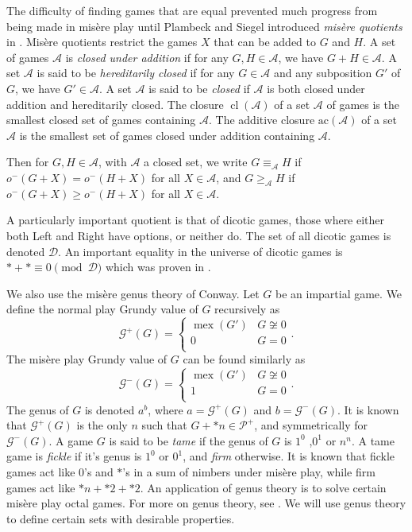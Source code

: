 \documentclass{amsart}
\theoremstyle{plain}
\theoremstyle{definition}
\theoremstyle{remark}
\numberwithin{equation}{section}
\numberwithin{thm}{section}
\DeclareMathOperator{\cl}{cl}
\DeclareMathOperator{\mex}{mex}
\begin{document}
The difficulty of finding games that are equal prevented much progress from being made in mis\`ere play until Plambeck and Siegel introduced \emph{mis\`ere quotients} in \cite{plambeck2008misere}. Mis\`ere quotients restrict the games $X$ that can be added to $G$ and $H$.
A set of games $\mathscr{A}$ is \emph{closed under addition} if for any $G,H \in \mathscr{A}$, we have $G +H \in \mathscr{A}$. A set $\mathscr{A}$ is said to be \emph{hereditarily closed} if for any $G \in \mathscr{A}$ and any subposition $G'$ of $G$, we have $G' \in \mathscr{A}$. A set $\mathscr{A}$ is said to be \emph{closed} if $\mathscr{A}$ is both closed under addition and hereditarily closed. The closure $\cl (\mathscr{A})$ of a set $\mathscr{A}$ of games is the smallest closed set of games containing $\mathscr{A}$. The additive closure $\text{ac}(\mathscr{A})$ of a set $\mathscr{A}$ is the smallest set of games closed under addition containing $\mathscr{A}$.

Then for $G,H \in \mathscr{A}$, with $\mathscr{A}$ a closed set, we write $G \equiv_{\mathscr{A}} H$ if $o^-(G+X)=o^-(H+X)$ for all $X \in \mathscr{A}$, and $G \geq_{\mathscr{A}} H$ if $o^-(G+X)\geq o^-(H+X)$ for all $X \in \mathscr{A}$. 

A particularly important quotient is that of dicotic games, those where either both Left and Right have options, or neither do. The set of all dicotic games is denoted $\mathscr{D}$. An important equality in the universe of dicotic games is $*+* \equiv 0 \pmod {\mathscr{D}}$ which was proven in \cite{allen2015peeking}.

We also use the mis\`ere genus theory of Conway. Let $G$ be an impartial game. We define the normal play Grundy value of $G$ recursively as \begin{equation}
    \mathcal{G}^+(G) = \begin{cases}
    \mex(G') & G \not \cong 0 \\
    0 & G  =0\\
\end{cases}.
\end{equation} The mis\`ere play Grundy value of $G$ can be found similarly as \begin{equation}
    \mathcal{G}^-(G) = \begin{cases}
    \mex(G') & G \not \cong 0 \\
    1 & G  =0\\
\end{cases}.
\end{equation} The genus of $G$ is denoted $a^b$, where $a = \mathcal{G}^+(G)$ and $b = \mathcal{G}^-(G)$. It is known that $\mathcal{G}^+(G)$ is the only $n$ such that $G+*n \in \mathcal{P}^+$, and symmetrically for $\mathcal{G}^-(G)$. A game $G$ is said to be \emph{tame} if the genus of $G$ is $1^0$ ,$0^1$ or $n^n$. A tame game is \emph{fickle} if it's genus is $1^0$ or $0^1$, and \emph{firm} otherwise. It is known that fickle games act like $0$'s and $*$'s in a sum of nimbers under mis\`ere play, while firm games act like $*n + *2+*2$.  An application of genus theory is to solve certain mis\`ere play octal games. For more on genus theory, see \cite{conway2000numbers}. We will use genus theory to define certain sets with desirable properties.
\end{document}
